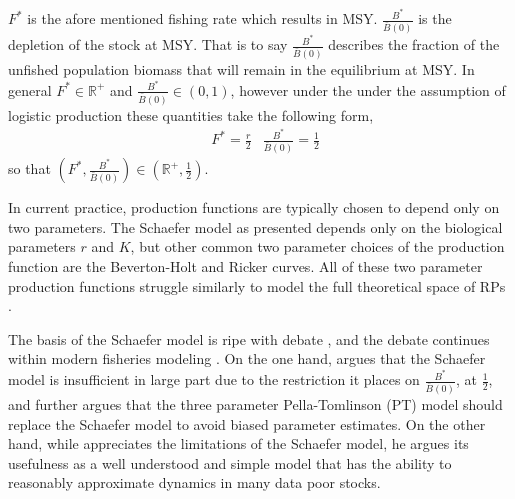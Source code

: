 \documentclass[12pt]{article}
\begin{document}
{%
$F^*$ is the afore mentioned fishing rate which results in MSY. $\frac{B^*}{\bar B(0)}$ 
is the depletion of the stock at MSY. That is to say $\frac{B^*}{\bar B(0)}$ describes 
the fraction of the unfished population biomass that will remain in the equilibrium 
at MSY. In general $F^*\in\mathbb{R}^+$ and \mbox{$\frac{B^*}{\bar B(0)}\in\left(0, 1\right)$,} 
however under the under the assumption of logistic production these 
quantities take the following form,  
%
\begin{align}
        &F^* = \frac{r}{2}
        &\frac{B^*}{\bar B(0)} = \frac{1}{2} \label{fbLogistic}
\end{align}
so that $\left(F^*, \frac{B^*}{\bar B(0)}\right)\in \left(\mathbb{R}^+, \frac{1}{2}\right)$.

%
In current practice, production functions are typically chosen to depend only 
on two parameters. The Schaefer model as presented depends only on
the biological parameters $r$ and $K$, but other common two parameter choices
of the production function are the Beverton-Holt  
and Ricker  curves. All of these two parameter 
production functions struggle similarly to model the full theoretical space of 
RPs .

The basis of the Schaefer model is ripe with debate , 
and the debate continues within modern fisheries modeling . 
On the one hand,  argues that the Schaefer model is 
insufficient in large part due to the restriction it places on $\frac{B^*}{\bar B(0)}$, 
at $\frac{1}{2}$, and further argues that the three parameter Pella-Tomlinson 
(PT) model  should replace the Schaefer model to avoid biased parameter 
estimates. On the other hand, while  appreciates 
the limitations of the Schaefer model, he argues its usefulness as a well 
understood and simple model that has the ability to reasonably 
approximate dynamics in many data poor stocks. %

%
%
%
%

}
\end{document}
